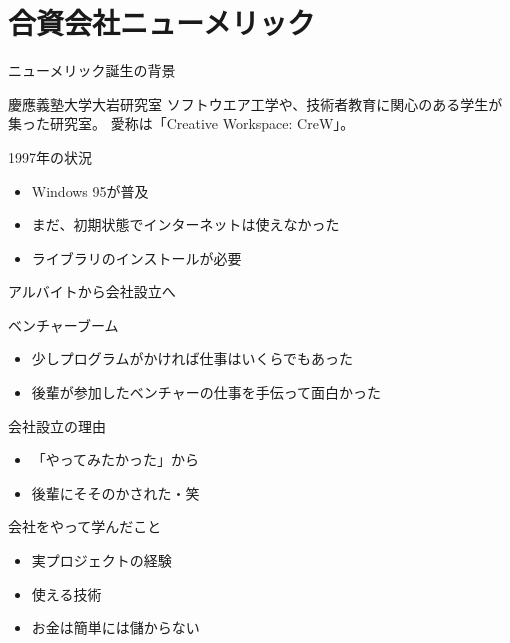 \documentclass[dvipdfmx]{beamer}
\begin{document}
\section{合資会社ニューメリック}
\label{sec-2}
\begin{frame}[label=sec-2-1]{ニューメリック誕生の背景}
\begin{block}{慶應義塾大学大岩研究室}
ソフトウエア工学や、技術者教育に関心のある学生が集った研究室。
愛称は「Creative Workspace: CreW」。
\end{block}
\begin{block}{1997年の状況}
\begin{itemize}
\item Windows 95が普及
\item まだ、初期状態でインターネットは使えなかった
\item ライブラリのインストールが必要
\end{itemize}
\end{block}
\end{frame}
\begin{frame}[label=sec-2-2]{アルバイトから会社設立へ}
\begin{block}{ベンチャーブーム}
\begin{itemize}
\item 少しプログラムがかければ仕事はいくらでもあった
\item 後輩が参加したベンチャーの仕事を手伝って面白かった
\end{itemize}
\end{block}
\begin{block}{会社設立の理由}
\begin{itemize}
\item 「やってみたかった」から
\item 後輩にそそのかされた・笑
\end{itemize}
\end{block}
\begin{block}{会社をやって学んだこと}
\begin{itemize}
\item 実プロジェクトの経験
\item 使える技術
\item お金は簡単には儲からない
\end{itemize}
\end{block}
\end{frame}
\end{document}
